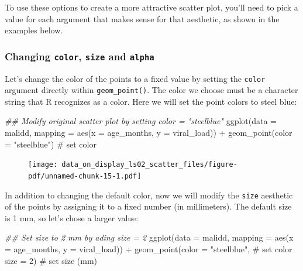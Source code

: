 \documentclass[
  letterpaper,
  DIV=11,
  numbers=noendperiod]{scrreprt}
\newenvironment{Shaded}{\begin{snugshade}}{\end{snugshade}}
\newcommand{\AttributeTok}[1]{\textcolor[rgb]{0.40,0.45,0.13}{#1}}
\newcommand{\CommentTok}[1]{\textcolor[rgb]{0.37,0.37,0.37}{#1}}
\newcommand{\DecValTok}[1]{\textcolor[rgb]{0.68,0.00,0.00}{#1}}
\newcommand{\DocumentationTok}[1]{\textcolor[rgb]{0.37,0.37,0.37}{\textit{#1}}}
\newcommand{\FunctionTok}[1]{\textcolor[rgb]{0.28,0.35,0.67}{#1}}
\newcommand{\NormalTok}[1]{\textcolor[rgb]{0.00,0.23,0.31}{#1}}
\newcommand{\SpecialCharTok}[1]{\textcolor[rgb]{0.37,0.37,0.37}{#1}}
\newcommand{\StringTok}[1]{\textcolor[rgb]{0.13,0.47,0.30}{#1}}
\begin{document}
To use these options to create a more attractive scatter plot, you'll
need to pick a value for each argument that makes sense for that
aesthetic, as shown in the examples below.

\hypertarget{changing-color-size-and-alpha}{%
\subsubsection{\texorpdfstring{Changing \texttt{color}, \texttt{size}
and
\texttt{alpha}}{Changing color, size and alpha}}\label{changing-color-size-and-alpha}}

Let's change the color of the points to a fixed value by setting the
\texttt{color} argument directly within \texttt{geom\_point()}. The
color we choose must be a character string that R recognizes as a color.
Here we will set the point colors to steel blue:

\begin{Shaded}
\begin{Highlighting}[]
\DocumentationTok{\#\#  Modify original scatter plot by setting \textasciigrave{}color = "steelblue"\textasciigrave{}}
\FunctionTok{ggplot}\NormalTok{(}\AttributeTok{data =}\NormalTok{ malidd, }
       \AttributeTok{mapping =} \FunctionTok{aes}\NormalTok{(}\AttributeTok{x =}\NormalTok{ age\_months, }
                     \AttributeTok{y =}\NormalTok{ viral\_load)) }\SpecialCharTok{+} 
  \FunctionTok{geom\_point}\NormalTok{(}\AttributeTok{color =} \StringTok{"steelblue"}\NormalTok{)       }\CommentTok{\# set color}
\end{Highlighting}
\end{Shaded}

\begin{figure}[H]

{\centering \texttt{[image: data\_on\_display\_ls02\_scatter\_files/figure-pdf/unnamed-chunk-15-1.pdf]}

}

\end{figure}

In addition to changing the default color, now we will modify the
\texttt{size} aesthetic of the points by assigning it to a fixed number
(in millimeters). The default size is 1 mm, so let's chose a larger
value:

\begin{Shaded}
\begin{Highlighting}[]
\DocumentationTok{\#\#  Set size to 2 mm by ading \textasciigrave{}size = 2\textasciigrave{}}
\FunctionTok{ggplot}\NormalTok{(}\AttributeTok{data =}\NormalTok{ malidd, }
       \AttributeTok{mapping =} \FunctionTok{aes}\NormalTok{(}\AttributeTok{x =}\NormalTok{ age\_months, }
                     \AttributeTok{y =}\NormalTok{ viral\_load)) }\SpecialCharTok{+} 
  \FunctionTok{geom\_point}\NormalTok{(}\AttributeTok{color =} \StringTok{"steelblue"}\NormalTok{,       }\CommentTok{\# set color}
             \AttributeTok{size =} \DecValTok{2}\NormalTok{)                  }\CommentTok{\# set size (mm)}
\end{Highlighting}
\end{Shaded}
\end{document}
